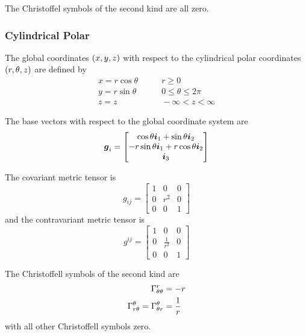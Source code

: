 The Christoffel symbols of the second kind are all zero.

\subsubsection{Cylindrical Polar}

The global coordinates  $\left( x,y,z \right)$ with respect to the cylindrical polar
coordinates $\left( r,\theta,z \right)$ are defined by
\begin{equation}
  \begin{aligned}
    x = r\cos\theta  & \qquad r \ge0 \\
    y = r\sin\theta & \qquad 0 \le\theta\le2\pi \\
    z = z          & \qquad -\infty < z < \infty
  \end{aligned}
\end{equation}

The base vectors with respect to the global coordinate system are
\begin{equation}
  \vect{g}_{i}=\begin{bmatrix} 
    \cos\theta\vect{i}_{1} + \sin\theta\vect{i}_{2} \\ 
    -r\sin\theta\vect{i}_{1}+ r\cos\theta\vect{i}_{2} \\
    \vect{i}_{3} 
  \end{bmatrix}
\end{equation}

The covariant metric tensor is
\begin{equation}
  g_{ij}=\begin{bmatrix}
    1 & 0 & 0 \\
    0 & r^{2} & 0 \\
    0 & 0 & 1
  \end{bmatrix}
\end{equation}
and the contravariant metric tensor is
\begin{equation}
  g^{ij}=\begin{bmatrix}
    1 & 0 & 0 \\
    0 & \frac{1}{r^{2}} & 0 \\
    0 & 0 & 1
  \end{bmatrix}
\end{equation}

The Christoffell symbols of the second kind are
\begin{align}
   \Gamma^{r}_{\theta\theta} &=-r \\
   \Gamma^{\theta}_{r\theta} = \Gamma^{\theta}_{\theta r} &=\frac{1}{r}
\end{align}
with all other Christoffell symbols zero.

